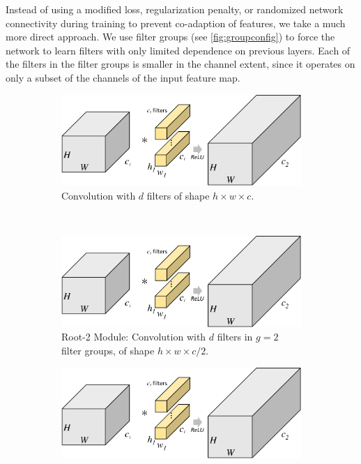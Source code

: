 \documentclass[thesis]{subfiles}
\begin{document}
	Instead of using a modified loss, regularization penalty, or randomized network connectivity during training to prevent co-adaption of features, we take a much more direct approach. We use filter groups (see \cref{fig:groupconfig}) to force the network to learn filters with only limited dependence on previous layers. Each of the filters in the filter groups is smaller in the channel extent, since it operates on only a subset of the channels of the input feature map. 
	
	\begin{figure}[tb]
		\centering
		\begin{subfigure}[b]{0.6\linewidth}
			\centering
			\includegraphics[width=\linewidth, page=4]{Figs/PDF/groupfig}
			\caption{Convolution with $d$ filters of shape $h\times w\times c$.}
			\label{fig:normalresnet}
		\end{subfigure}\\
		\begin{subfigure}[b]{0.6\linewidth}
			\includegraphics[width=\linewidth, page=5]{Figs/PDF/groupfig}
			\caption{Root-2 Module: Convolution with $d$ filters in $g = 2$ filter groups, of shape $h\times w\times c/2$.}
			\label{fig:rootresnet2}
		\end{subfigure}
		\begin{subfigure}[b]{0.6\linewidth}
			\includegraphics[width=\linewidth, page=6]{Figs/PDF/groupfig}

\end{subfigure}
\end{figure}
\end{document}
